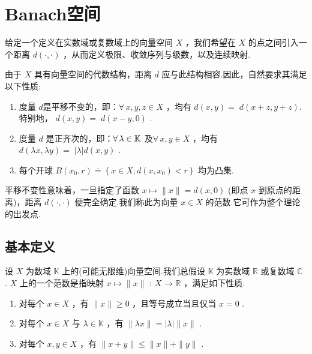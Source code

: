 ﻿\chapter{Banach空间}

\vspace{-2 em}
给定一个定义在实数域或复数域上的向量空间 $X$ ，我们希望在 $X$ 的点之间引入一个距离 $d\left( {\cdot , \cdot  }\right)$ ，从而定义极限、收敛序列与级数，以及连续映射.

由于 $X$ 具有向量空间的代数结构，距离 $d$ 应与此结构相容.因此，自然要求其满足以下性质:
\begin{enumerate}[label=(p\arabic*),leftmargin=2.5em]
    \item 度量 $d$是平移不变的，即：$\forall\,x,y,z \in  X$ ，均有 $d\left( {x,y}\right)  = \; d\left( {x + z,y + z}\right)$.特别地， $d\left( {x,y}\right)  = \; d\left( {x - y,0}\right)$ .
    \item 度量 $d$ 是正齐次的，即：$\forall\,\lambda\in\mathbb{K}$ 及$\forall\,x,y \in  X$ ，均有 $d\left( {{\lambda x},{\lambda y}}\right)  = \; \left| \lambda \right| d\left( {x,y}\right)$ .
    \item 每个开球 $B\left( {{x}_{0},r}\right)  \doteq  \left\{  {x \in  X;d\left( {x,{x}_{0}}\right)  < r}\right\}$ 均为凸集.
\end{enumerate}

平移不变性意味着，一旦指定了函数 $x \mapsto  \| x\|  = d\left( {x,0}\right)$ (即点 $x$ 到原点的距离)，距离 $d\left( {\cdot , \cdot  }\right)$ 便完全确定.我们称此为向量 $x \in  X$ 的范数.它可作为整个理论的出发点.

\section{基本定义}

设 $X$ 为数域 $\mathbb{K}$ 上的(可能无限维)向量空间.我们总假设 $\mathbb{K}$ 为实数域 $\mathbb{R}$ 或复数域 $\mathbb{C}$ . $X$ 上的一个范数是指映射 $x \mapsto  \| x\|$ : $X$ → $\mathbb{R}$ ，满足如下性质.
\begin{property}[范数的性质]
\begin{enumerate}[label=(N\arabic*),leftmargin=2.5em]
    \item 对每个 $x \in  X$ ，有 $\| x\|  \geq  0$ ，且等号成立当且仅当 $x = 0$ .
    \item 对每个 $x \in  X$ 与 $\lambda  \in  \mathbb{K}$ ，有 $\| {\lambda x}\|  = \left| \lambda \right| \| x\|$ .
    \item 对每个 $x,y \in  X$ ，有 $\| x + y\|  \leq  \| x\|  + \| y\|$ .
\end{enumerate}

\end{property}




